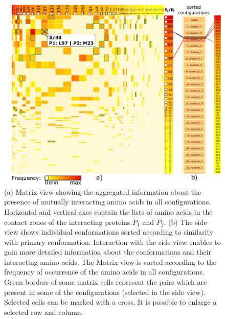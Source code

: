\documentclass{bmcart}
\def\MatView {Matrix view\xspace}
\begin{document}
\begin{backmatter}
\begin{figure}[h!]
  \centering
  \includegraphics[width=\columnwidth]{images/figure4.pdf}
  \caption{
  (a) \MatView showing the aggregated information about the presence of mutually interacting amino acids in all configurations. Horizontal and vertical axes contain the lists of amino acids in the contact zones of the interacting proteins $P_1$ and $P_2$. (b) The side view shows individual conformations sorted according to similarity with primary conformation. Interaction with the side view enables to gain more detailed information about the conformations and their interacting amino acids. The \MatView is sorted according to the frequency of occurrence of the amino acids in all configurations. Green borders of some matrix cells represent the pairs which are present in some of the configurations (selected in the side view). Selected cells can be marked with a cross. It is possible to enlarge a selected row and column.}
  \label{fig:matrixlens}
\end{figure}





\end{backmatter}
\end{document}
